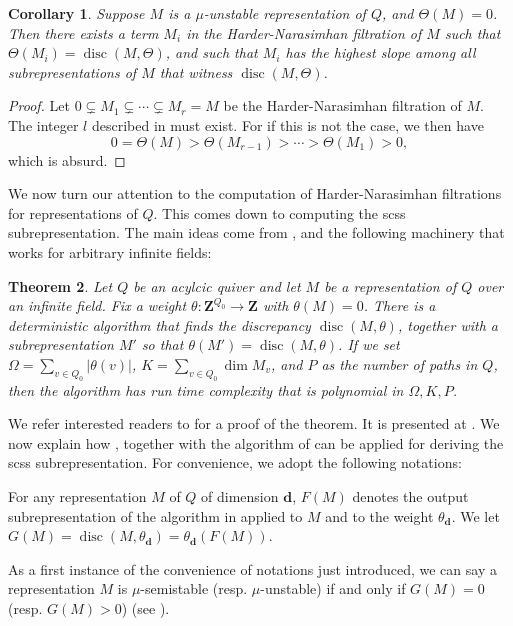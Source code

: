 \documentclass[a4paper]{amsart}
\numberwithin{equation}{section}
\theoremstyle{plain}
\newtheorem{theorem}{Theorem}[section]
\newtheorem{corollary}[theorem]{Corollary}
\theoremstyle{definition}
\newenvironment{notation}[1][Notation]
{\begin{trivlist} \item[\hskip \labelsep {\bfseries #1}]}
{\end{trivlist}}
\DeclareMathOperator{\disc}{disc}
\begin{document}
\begin{corollary}\label{HN_contains_witness_discrepancy_corollary}
Suppose $M$ is a $\mu$-unstable representation of $Q$, and $\Theta(M)=0$. Then there exists a term $M_i$ in the Harder-Narasimhan filtration of $M$ such that $\Theta(M_i)=\disc(M,\Theta)$, and such that $M_i$ has the highest slope among all subrepresentations of $M$ that witness $\disc(M,\Theta)$.
\end{corollary}

\begin{proof}
Let $0\subsetneq M_1\subsetneq\cdots\subsetneq M_r =M$ be the Harder-Narasimhan filtration of $M$. The integer $l$ described in  must exist. For if this is not the case, we then have $$0=\Theta(M)>\Theta(M_{r-1})>\cdots>\Theta(M_1)>0,$$ which is absurd. 
\end{proof}

We now turn our attention to the computation of Harder-Narasimhan filtrations for representations of $Q$. This comes down to computing the scss subrepresentation. The main ideas come from , and the following machinery that works for arbitrary infinite fields:
\begin{theorem}\label{discrepancy_rep_algorithm}
Let $Q$ be an acylcic quiver and let $M$ be a representation of $Q$ over an infinite field. Fix a weight $\theta:\mathbf{Z}^{Q_0}\rightarrow\mathbf{Z}$ with $\theta(M)=0$. There is a deterministic algorithm that finds the discrepancy $\disc(M,\theta)$, together with a subrepresentation $M'$ so that $\theta(M')=\disc(M,\theta)$. If we set  $\Omega=\sum_{v\in Q_0}|\theta(v)|$, $K=\sum_{v\in Q_0}\dim M_v$, and $P$ as the number of paths in $Q$, then the algorithm has run time complexity that is polynomial in $\Omega,K,P$. 
\end{theorem}

We refer interested readers to  for a proof of the theorem. It is presented at . We now explain how , together with the algorithm of  can be applied for deriving the scss subrepresentation. For convenience, we adopt the following notations:
\begin{notation}
For any representation $M$ of $Q$ of dimension $\mathbf{d}$, $F(M)$ denotes the output subrepresentation of the algorithm in  applied to $M$ and to the weight $\theta_{\mathbf{d}}$.  We let $G(M)=\disc(M,\theta_{\mathbf{d}})=\theta_{\mathbf{d}}(F(M)).$
\end{notation}
As a first instance of the convenience of notations just introduced, we can say a representation $M$ is $\mu$-semistable (resp. $\mu$-unstable) if and only if $G(M)=0$ (resp. $G(M)>0$) (see ).
\end{document}
